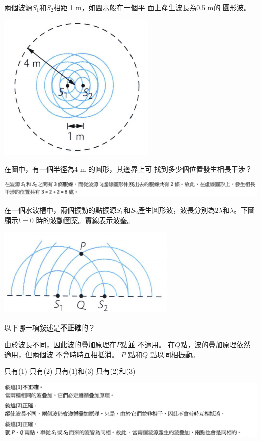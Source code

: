 {
    兩個波源$S_1$和$S_2$相距 1 m，如圖示般在一個平 面上產生波長為0.5 m的 圓形波。
    \par{\par\centering\includegraphics[width=.25\textwidth]{./img/ch3_earlyclass_wave_mc_2024-05-14-13-23-18.png}\par}
    在圖中，有一個半徑為4 m 的圓形，其邊界上可 找到多少個位置發生相長干涉？
    \begin{tasks}
    \end{tasks}

}{
    \par{\par\centering\includegraphics[width=\textwidth]{./img/ch3_earlyclass_wave_mc_2024-05-14-13-24-29.png}\par}
}

{
    在一個水波槽中，兩個振動的點振源$S_1$和$S_2$產生圓形波，波長分別為$2\lambda$和$\lambda$。下圖顯示$t=0$ 時的波動圖案。實線表示波峯。
    \par{\par\centering\includegraphics[width=.35\textwidth]{./img/ch3_earlyclass_wave_mc_2024-05-14-13-24-57.png}\par}
    以下哪一項敍述是\textbf{不正確}的？
    \begin{statements}
        \task 由於波長不同，因此波的疊加原理在$P$點並 不適用。
        \task 在$Q$點，波的疊加原理依然適用，但兩個波 不會時時互相抵消。
        \task $P$ 點和$Q$ 點以同相振動。
    \end{statements}
    \begin{tasks}
        \task 只有(1)
        \task 只有(2)
        \task 只有(1)和(3)
        \task 只有(2)和(3)
    \end{tasks}
}{
    \par{\par\centering\includegraphics[width=\textwidth]{./img/ch3_earlyclass_wave_mc_2024-05-14-13-31-18.png}\par}
}

